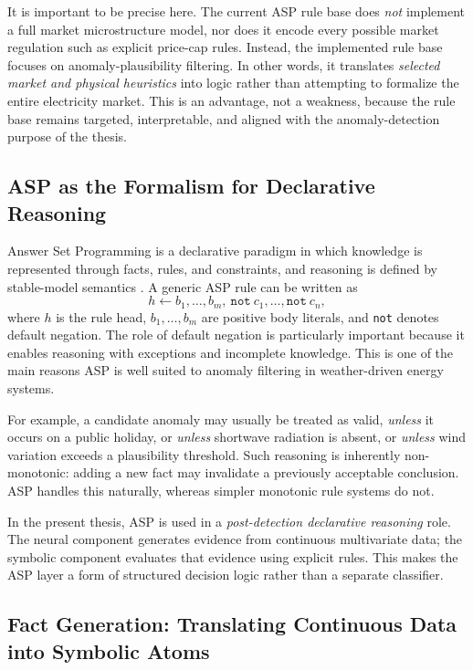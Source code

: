 It is important to be precise here. The current ASP rule base does \emph{not} implement a full market microstructure model, nor does it encode every possible market regulation such as explicit price-cap rules. Instead, the implemented rule base focuses on anomaly-plausibility filtering. In other words, it translates \emph{selected market and physical heuristics} into logic rather than attempting to formalize the entire electricity market. This is an advantage, not a weakness, because the rule base remains targeted, interpretable, and aligned with the anomaly-detection purpose of the thesis.

\subsection{ASP as the Formalism for Declarative Reasoning}

Answer Set Programming is a declarative paradigm in which knowledge is represented through facts, rules, and constraints, and reasoning is defined by stable-model semantics \cite{gelfond1988stable,gebser2012answer}. A generic ASP rule can be written as
\begin{equation}
	h \leftarrow b_1,\dots,b_m,\ \texttt{not}\ c_1,\dots,\texttt{not}\ c_n,
	\label{eq:asp_general_ch43}
\end{equation}
where $h$ is the rule head, $b_1,\dots,b_m$ are positive body literals, and \texttt{not} denotes default negation. The role of default negation is particularly important because it enables reasoning with exceptions and incomplete knowledge. This is one of the main reasons ASP is well suited to anomaly filtering in weather-driven energy systems.

For example, a candidate anomaly may usually be treated as valid, \emph{unless} it occurs on a public holiday, or \emph{unless} shortwave radiation is absent, or \emph{unless} wind variation exceeds a plausibility threshold. Such reasoning is inherently non-monotonic: adding a new fact may invalidate a previously acceptable conclusion. ASP handles this naturally, whereas simpler monotonic rule systems do not.

In the present thesis, ASP is used in a \emph{post-detection declarative reasoning} role. The neural component generates evidence from continuous multivariate data; the symbolic component evaluates that evidence using explicit rules. This makes the ASP layer a form of structured decision logic rather than a separate classifier.

\subsection{Fact Generation: Translating Continuous Data into Symbolic Atoms}

